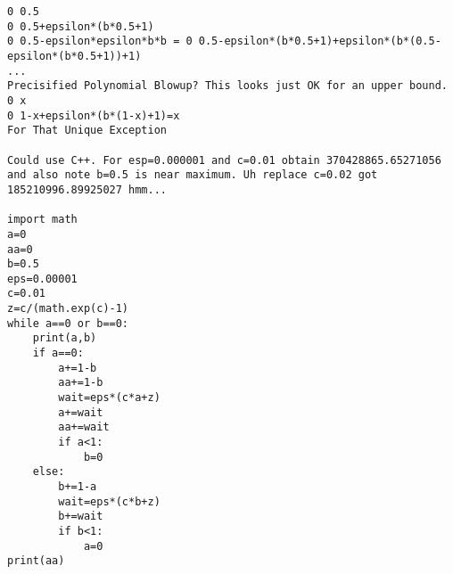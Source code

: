 \begin{verbatim}
0 0.5
0 0.5+epsilon*(b*0.5+1)
0 0.5-epsilon*epsilon*b*b = 0 0.5-epsilon*(b*0.5+1)+epsilon*(b*(0.5-epsilon*(b*0.5+1))+1)
...
Precisified Polynomial Blowup? This looks just OK for an upper bound.
0 x
0 1-x+epsilon*(b*(1-x)+1)=x
For That Unique Exception

Could use C++. For esp=0.000001 and c=0.01 obtain 370428865.65271056 and also note b=0.5 is near maximum. Uh replace c=0.02 got 185210996.89925027 hmm...

import math
a=0
aa=0
b=0.5
eps=0.00001
c=0.01
z=c/(math.exp(c)-1)
while a==0 or b==0:
    print(a,b)
    if a==0:
        a+=1-b
        aa+=1-b
        wait=eps*(c*a+z)
        a+=wait
        aa+=wait
        if a<1:
            b=0
    else:
        b+=1-a
        wait=eps*(c*b+z)
        b+=wait
        if b<1:
            a=0
print(aa)
\end{verbatim}